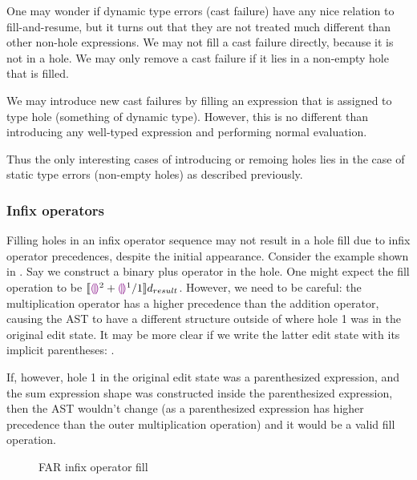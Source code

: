 One may wonder if dynamic type errors (cast failure) have any nice relation to fill-and-resume, but it turns out that they are not treated much different than other non-hole expressions. We may not fill a cast failure directly, because it is not in a hole. We may only remove a cast failure if it lies in a non-empty hole that is filled.

We may introduce new cast failures by filling an expression that is assigned to type hole (something of dynamic type). However, this is no different than introducing any well-typed expression and performing normal evaluation.

Thus the only interesting cases of introducing or remoing holes lies in the case of static type errors (non-empty holes) as described previously.

\subsubsection{Infix operators}
\label{sec:far-infix-operators}

Filling holes in an infix operator sequence may not result in a hole fill due to infix operator precedences, despite the initial appearance. Consider the example shown in . Say we construct a binary plus operator in the hole. One might expect the fill operation to be $\llbracket{}\textcolor{violet}{\llparenthesis}\textcolor{violet}{\rrparenthesis}^2+\textcolor{violet}{\llparenthesis}\textcolor{violet}{\rrparenthesis}^1/1\rrbracket{}d_{result}$. However, we need to be careful: the multiplication operator has a higher precedence than the addition operator, causing the AST to have a different structure outside of where hole 1 was in the original edit state. It may be more clear if we write the latter edit state with its implicit parentheses: .

If, however, hole 1 in the original edit state was a parenthesized expression, and the sum expression shape was constructed inside the parenthesized expression, then the AST wouldn't change (as a parenthesized expression has higher precedence than the outer multiplication operation) and it would be a valid fill operation.

\begin{figure}
  \centering
  \begin{singlespace}
  \end{singlespace}
  \caption{FAR infix operator fill}
  \label{fig:far-infix-operator-fill}
\end{figure}

